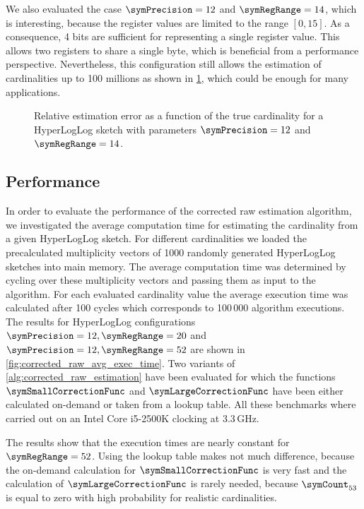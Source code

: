 \documentclass[a4paper]{scrartcl}
\begin{document}
We also evaluated the case $\symPrecision = 12$ and $\symRegRange=14$, which is interesting, because the register values are limited to the range $[0, 15]$. As a consequence, 4 bits are sufficient for representing a single register value. This allows two registers to share a single byte, which is beneficial from a performance perspective. Nevertheless, this configuration still allows the estimation of cardinalities up to 100 millions as shown in \cref{fig:raw_corrected_estimation_error_12_14}, which could be enough for many applications.

\begin{figure}
\centering

\caption{Relative estimation error as a function of the true cardinality for a HyperLogLog sketch with parameters $\symPrecision = 12$ and $\symRegRange=14$.}
\label{fig:raw_corrected_estimation_error_12_14}
\end{figure}

\subsection{Performance}
In order to evaluate the performance of the corrected raw estimation algorithm, we investigated the average computation time for estimating the cardinality from a given HyperLogLog sketch. For different cardinalities we loaded the precalculated multiplicity vectors of 1000 randomly generated HyperLogLog sketches into main memory. The average computation time was determined by cycling over these multiplicity vectors and passing them as input to the algorithm. For each evaluated cardinality value the average execution time was calculated after 100 cycles which corresponds to 100\,000 algorithm executions. The results for HyperLogLog configurations $\symPrecision=12, \symRegRange=20$ and $\symPrecision=12, \symRegRange=52$ are shown in \cref{fig:corrected_raw_avg_exec_time}. Two variants of \cref{alg:corrected_raw_estimation} have been evaluated for which the functions $\symSmallCorrectionFunc$ and $\symLargeCorrectionFunc$ have been either calculated on-demand or taken from a lookup table. All these benchmarks where carried out on an Intel Core i5-2500K clocking at 3.3\,GHz. 

The results show that the execution times are nearly constant for $\symRegRange=52$. Using the lookup table makes not much difference, because the on-demand calculation for  $\symSmallCorrectionFunc$ is very fast and the calculation of $\symLargeCorrectionFunc$ is rarely needed, because $\symCount_{53}$ is equal to zero with high probability for realistic cardinalities.
\end{document}
